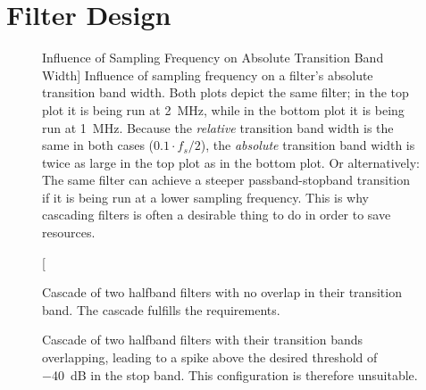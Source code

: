 \chapter{Filter Design} %
\label{ch:filter_design}

\begin{figure}
    \centering
    
    \caption
        [Influence of Sampling Frequency on Absolute Transition Band Width]{%
        Influence of sampling frequency on a filter's absolute transition band
        width.  Both plots depict the same filter; in the top plot it is being
        run  at \SI{2}{\MHz},  while in  the bottom  plot it  is being  run at
        \SI{1}{\MHz}. Because the \emph{relative} transition band width is the
        same in both cases ($0.1 \cdot f_s/2$), the \emph{absolute} transition
        band width is twice as large in the top plot as in the bottom plot. Or
        alternatively: The same filter can achieve a steeper passband-stopband
        transition if it  is being run at a lower  sampling frequency. This is
        why cascading  filters is often  a desirable thing  to do in  order to
        save resources.%
    }
    \label{fic:fdesign:tbw_width}
\end{figure}

\begin{figure}
    \centering
    
    \caption[Cascade: No Transition Band Overlap]{%
        Cascade of two halfband filters with no overlap in their transition
        band. The cascade fulfills the requirements.%
    }
    \label{fig:fdesign:cascade:good}
\end{figure}
\begin{figure}
    \centering
    
    \caption[Cascade: Transition Band Overlap]{%
        Cascade  of   two  halfband   filters  with  their   transition  bands
        overlapping,  leading  to  a  spike above  the  desired  threshold  of
        \SI{-40}{\dB}  in  the  stop  band. This  configuration  is  therefore
        unsuitable.%
    }
    \label{fig:fdesign:cascade:bad}
\end{figure}


